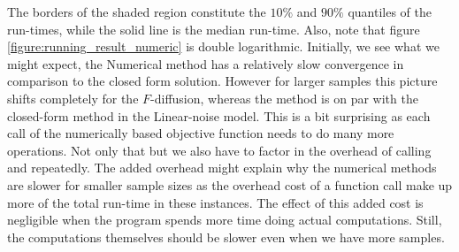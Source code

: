 The borders of the shaded region constitute the $10\%$ and $90\%$ quantiles of the run-times, while the solid line is the median run-time. Also, note that figure \ref{figure:running_result_numeric} is double logarithmic. Initially, we see what we might expect, the Numerical method has a relatively slow convergence in comparison to the closed form solution. However for larger samples this picture shifts completely for the $F$-diffusion, whereas the method is on par with the closed-form method in the Linear-noise model. This is a bit surprising as each call of the numerically based objective function needs to do many more operations. Not only that but we also have to factor in the overhead of calling  and  repeatedly. The added overhead might explain why the numerical methods are slower for smaller sample sizes as the overhead cost of a function call make up more of the total run-time in these instances. The effect of this added cost is negligible when the program spends more time doing actual computations. Still, the computations themselves should be slower even when we have more samples. 

